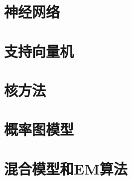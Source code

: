 \chapter{神经网络}








\chapter{支持向量机}






\chapter{核方法}





%
%
%
\chapter{概率图模型}







\chapter{混合模型和EM算法}





